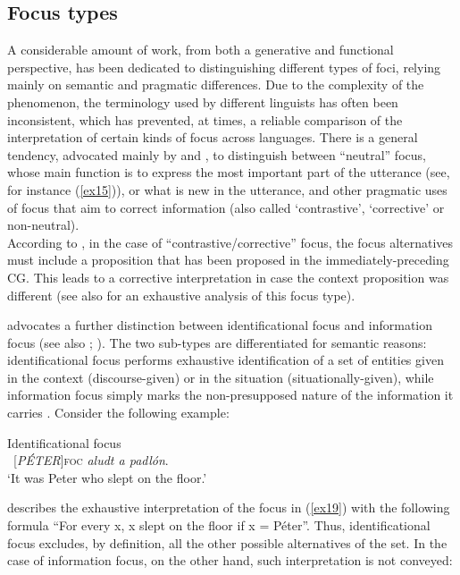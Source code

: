 \subsection{Focus types} 

A considerable amount of work, from both a generative and functional perspective,  has been dedicated to distinguishing different types of foci, relying mainly on semantic and pragmatic differences. Due to the complexity of the phenomenon, the terminology used by different linguists has often been inconsistent, which has prevented, at times, a reliable comparison of the interpretation of certain kinds of focus across languages. 
There is a general tendency, advocated mainly by \textcite{bolinger1972intonation} and \textcite{schmerling1973aspects}, to distinguish between ``neutral” focus, whose main function is to express the most important part of the utterance (see, for instance (\ref{ex15})), or what is new in the utterance, and other pragmatic uses of focus that aim to correct information (also called `contrastive', `corrective' or non-neutral).\\
According to \textcite{krifka2008basic}, in the case of ``contrastive/corrective” focus, the focus alternatives must include a proposition that has been proposed in the immediately-preceding CG. This leads to a corrective interpretation in case the context proposition was different (see also \cite{truckenbrodt1995phonological, rooth1996focus, steube2001correction, van2004incompatibility, REPP20101333} for an exhaustive analysis of this focus type).

 \textcite{kiss1998identificational} advocates a further distinction between identificational focus and information focus (see also \cite{rochemont1986focus}; \cite{campos1990focalization}). The two sub-types are  differentiated for semantic reasons: identificational focus performs exhaustive identification of a set of entities given in the context (discourse-given) or in the situation (situationally-given), while information focus simply marks the non-presupposed nature of the information it carries \parencite{riester2013focus}. Consider the following example:
 
\ea \label{ex19}   {Identificational focus}\\
 \ [\textit{PÉTER}]\textsc{foc} \normalsize \textit{aludt a padlón}.\\
‘It was Peter who slept on the floor.’ \hfill \parencite[75]{kiss2008topic}   

\z

 \textcite{szabolcsi1981semantics} describes the exhaustive interpretation of the focus in (\ref{ex19}) with the following formula ``For every x, x slept on the floor if x = Péter”. Thus, identificational focus excludes, by definition, all the other possible alternatives of the set. In the case of information focus, on the other hand, such interpretation is not conveyed:

